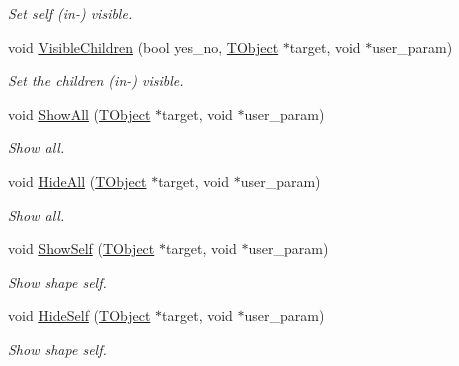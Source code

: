 \begin{DoxyCompactItemize}
\begin{DoxyCompactList}\small\item\em Set self (in-\/) visible. \item\end{DoxyCompactList}\item 
void \hyperlink{class_d_d4hep_1_1_eve_user_context_menu_acf1a858a9cb9c8ba26bd351300a53a3c}{VisibleChildren} (bool yes\_\-no, \hyperlink{class_t_object}{TObject} $\ast$target, void $\ast$user\_\-param)
\begin{DoxyCompactList}\small\item\em Set the children (in-\/) visible. \item\end{DoxyCompactList}\item 
void \hyperlink{class_d_d4hep_1_1_eve_user_context_menu_a0ee719ceeea4256e11c3381657df7c24}{ShowAll} (\hyperlink{class_t_object}{TObject} $\ast$target, void $\ast$user\_\-param)
\begin{DoxyCompactList}\small\item\em Show all. \item\end{DoxyCompactList}\item 
void \hyperlink{class_d_d4hep_1_1_eve_user_context_menu_a9aad9343ba738d4e4fdbfe80ecdcec4e}{HideAll} (\hyperlink{class_t_object}{TObject} $\ast$target, void $\ast$user\_\-param)
\begin{DoxyCompactList}\small\item\em Show all. \item\end{DoxyCompactList}\item 
void \hyperlink{class_d_d4hep_1_1_eve_user_context_menu_a38b76e87d1f304a24dc46692090c9c7f}{ShowSelf} (\hyperlink{class_t_object}{TObject} $\ast$target, void $\ast$user\_\-param)
\begin{DoxyCompactList}\small\item\em Show shape self. \item\end{DoxyCompactList}\item 
void \hyperlink{class_d_d4hep_1_1_eve_user_context_menu_afdf1b8efe4a72dd81ec77f0b49b36b0c}{HideSelf} (\hyperlink{class_t_object}{TObject} $\ast$target, void $\ast$user\_\-param)
\begin{DoxyCompactList}\small\item\em Show shape self. \item\end{DoxyCompactList}\item 

\end{DoxyCompactItemize}
